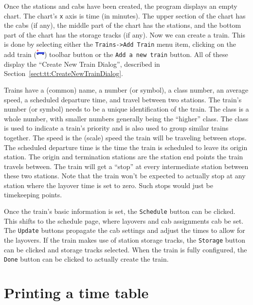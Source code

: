 Once the stations and cabs have been created, the program displays an
empty chart.  The chart's \verb=x= axis is time (in minutes).  The upper
section of the chart has the cabs (if any), the middle part of the chart
has the stations, and the bottom part of the chart has the storage
tracks (if any).  Now we can create a train.  This is done by selecting
either the \verb=Trains->Add Train= menu item, clicking on the add train
(\includegraphics{TTaddtrain.png}) toolbar button or the 
\verb=Add a new train= button.  All of these display the ``Create New
Train Dialog'', described in Section~\ref{sect:tt:CreateNewTrainDialog}.

Trains have a (common) name, a number (or symbol), a class number, an average
speed, a scheduled departure time, and travel between two stations.  The
train's number (or symbol) needs to be a unique identification of the
train. The class is a whole number, with smaller numbers generally being
the ``higher'' class.  The class is used to indicate a train's priority
and is also used to group similar trains together.  The speed is the
(scale) speed the train will be traveling between stops.  The scheduled
departure time is the time the train is scheduled to leave its origin
station.  The origin and termination stations are the station end points
the train travels between.  The train will get a ``stop'' at every
intermediate station between these two stations.  Note that the train
won't be expected to actually stop at any station where the layover time
is set to zero.  Such stops would just be timekeeping points.

Once the train's basic information is set, the \verb=Schedule= button can be
clicked.  This shifts to the schedule page, where layovers and cab
assignments cab be set.  The \verb=Update= buttons propagate the
cab settings and adjust the times to allow for the layovers.  If the
train makes use of station storage tracks, the \verb=Storage= button can
be clicked and storage tracks selected.  When the train is fully
configured, the \verb=Done= button can be clicked to actually create the
train.

\section{Printing a time table}

